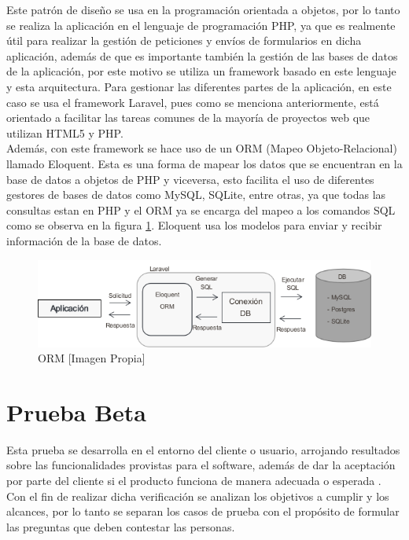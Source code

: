 Este patrón de diseño se usa en la programación orientada a objetos, por lo tanto se realiza la aplicación en el lenguaje de programación PHP, ya que es realmente útil para realizar la gestión de peticiones y envíos de formularios en dicha aplicación, además de que es importante también la gestión de las bases de datos de la aplicación, por este motivo se utiliza un framework basado en este lenguaje y esta arquitectura. Para gestionar las diferentes partes de la aplicación, en este caso se usa el framework Laravel, pues como se menciona anteriormente, está orientado a facilitar las tareas comunes de la mayoría de proyectos web que utilizan HTML5 y PHP.\\

Además, con este framework se hace uso de un ORM (Mapeo Objeto-Relacional) llamado Eloquent. Esta es una forma de mapear los datos que se encuentran en la base de datos a objetos de PHP y viceversa, esto facilita el uso de diferentes gestores de bases de datos como MySQL, SQLite, entre otras, ya que todas las consultas estan en PHP y el ORM ya se encarga del mapeo a los comandos SQL como se observa en la figura \ref{fig:orm}. Eloquent usa los modelos para enviar y recibir información de la base de datos\cite{Eloq}.\\

\begin{figure}[H]
	\centering
	\caption[ORM]{ORM [Imagen Propia]}
	\label{fig:orm}
	\includegraphics[width=0.7\linewidth]{Imagenes/ORM}
\end{figure}

\section{Prueba Beta}

Esta prueba se desarrolla en el entorno del cliente o usuario, arrojando resultados sobre las funcionalidades provistas para el software, además de dar la aceptación por parte del cliente si el producto funciona de manera adecuada o esperada \cite{PB}. Con el fin de realizar dicha verificación se analizan los objetivos a cumplir y los alcances, por lo tanto se separan los casos de prueba con el propósito de formular las preguntas que deben contestar las personas.\\

